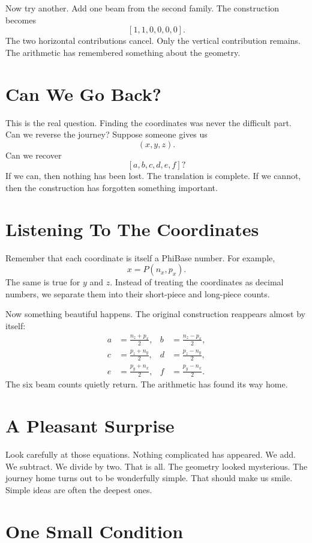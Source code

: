 Now try another. Add one beam from the second family. The construction becomes
\[
[1,1,0,0,0,0].
\]
The two horizontal contributions cancel. Only the vertical contribution remains. The arithmetic has remembered something about the geometry.

\section*{Can We Go Back?}

This is the real question. Finding the coordinates was never the difficult part. Can we reverse the journey? Suppose someone gives us
\[
(x,y,z).
\]
Can we recover
\[
[a,b,c,d,e,f]?
\]
If we can, then nothing has been lost. The translation is complete. If we cannot, then the construction has forgotten something important.

\section*{Listening To The Coordinates}

Remember that each coordinate is itself a PhiBase number. For example,
\[
x=P(n_x,p_x).
\]
The same is true for \(y\) and \(z\). Instead of treating the coordinates as decimal numbers, we separate them into their short-piece and long-piece counts.

Now something beautiful happens. The original construction reappears almost by itself:
\[
\begin{aligned}
a&=\frac{n_z+p_x}{2}, & b&=\frac{n_z-p_x}{2},\\
c&=\frac{p_z+n_y}{2}, & d&=\frac{p_z-n_y}{2},\\
e&=\frac{p_y+n_x}{2}, & f&=\frac{p_y-n_x}{2}.
\end{aligned}
\]
The six beam counts quietly return. The arithmetic has found its way home.

\section*{A Pleasant Surprise}

Look carefully at those equations. Nothing complicated has appeared. We add. We subtract. We divide by two. That is all. The geometry looked mysterious. The journey home turns out to be wonderfully simple. That should make us smile. Simple ideas are often the deepest ones.

\section*{One Small Condition}


